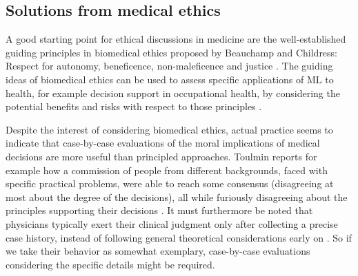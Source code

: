 \subsection{Solutions from medical ethics}
    A good starting point for ethical discussions in medicine are the well-established guiding principles in biomedical ethics proposed by Beauchamp and Childress: Respect for autonomy, beneficence, non-maleficence and justice \cite{Dijkstra2020, Morley2020, Rajkomar2018}.
    The guiding ideas of biomedical ethics can be used to assess specific applications of ML to health, for example decision support in occupational health, by considering the potential benefits and risks with respect to those principles \cite{Dijkstra2020}.

    Despite the interest of considering biomedical ethics, actual practice seems to indicate that case-by-case evaluations of the moral implications of medical decisions are more useful than principled approaches.
    Toulmin\cite{Toulmin1982} reports for example how a commission of people from different backgrounds, faced with specific practical problems, were able to reach some consensus (disagreeing at most about the degree of the decisions), all while furiously disagreeing about the principles supporting their decisions \cite{Toulmin1982}.
    It must furthermore be noted that physicians typically exert their clinical judgment only after collecting a precise case history, instead of following general theoretical considerations early on \cite{Toulmin1982}.
    So if we take their behavior as somewhat exemplary, case-by-case evaluations considering the specific details might be required.
